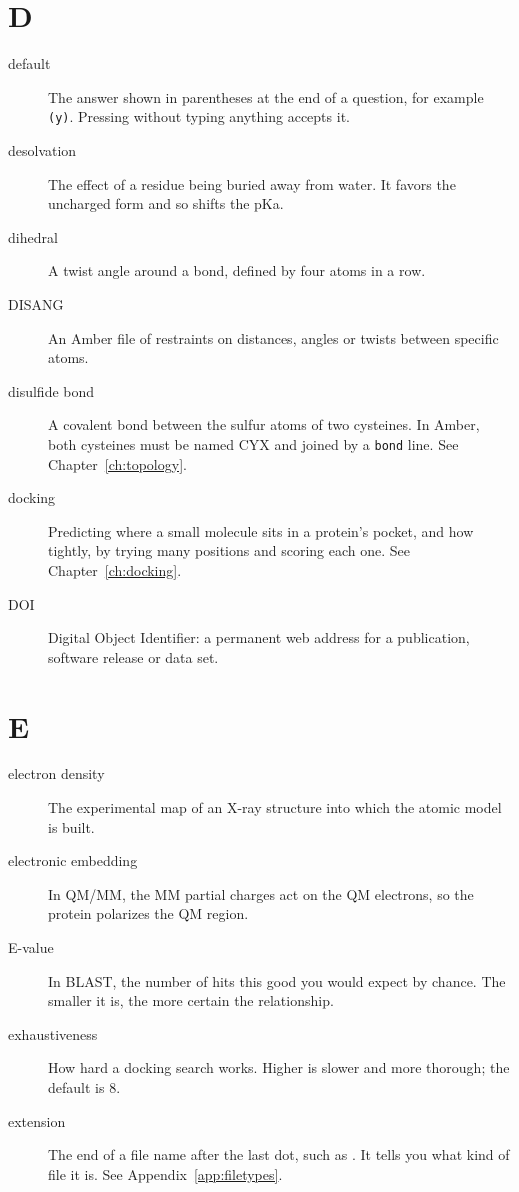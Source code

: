 \section*{D}

\begin{description}
\item[default] The answer shown in parentheses at the end of a question, for
  example \texttt{(y)}. Pressing  without typing anything accepts
  it.
\item[desolvation] The effect of a residue being buried away from water. It
  favors the uncharged form and so shifts the pKa.
\item[dihedral] A twist angle around a bond, defined by four atoms in a row.
\item[DISANG] An Amber file of restraints on distances, angles or twists
  between specific atoms.
\item[disulfide bond] A covalent bond between the sulfur atoms of two
  cysteines. In Amber, both cysteines must be named CYX and joined by a
  \texttt{bond} line. See Chapter~\ref{ch:topology}.
\item[docking] Predicting where a small molecule sits in a protein's pocket,
  and how tightly, by trying many positions and scoring each one. See
  Chapter~\ref{ch:docking}.
\item[DOI] Digital Object Identifier: a permanent web address for a
  publication, software release or data set.
\end{description}

\section*{E}

\begin{description}
\item[electron density] The experimental map of an X-ray structure into which
  the atomic model is built.
\item[electronic embedding] In QM/MM, the MM partial charges act on the QM
  electrons, so the protein polarizes the QM region.
\item[E-value] In BLAST, the number of hits this good you would expect by
  chance. The smaller it is, the more certain the relationship.
\item[exhaustiveness] How hard a docking search works. Higher is slower and
  more thorough; the default is 8.
\item[extension] The end of a file name after the last dot, such as
  . It tells you what kind of file it is. See
  Appendix~\ref{app:filetypes}.
\end{description}

